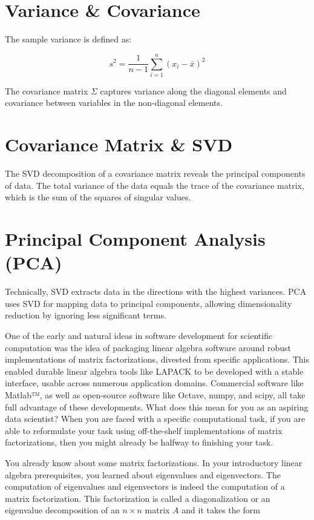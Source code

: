 \documentclass{ximera}
\begin{document}
\begin{problem}
\begin{problem}
\section{Variance \& Covariance}
The sample variance is defined as:

\[
s^2 = \frac{1}{n-1} \sum_{i=1}^n (x_i - \bar{x})^2
\]

The covariance matrix \(\Sigma\) captures variance along the diagonal elements and covariance between variables in the non-diagonal elements.

\section{Covariance Matrix \& SVD}
The SVD decomposition of a covariance matrix reveals the principal components of data. The total variance of the data equals the trace of the covariance matrix, which is the sum of the squares of singular values.

\section{Principal Component Analysis (PCA)}
Technically, SVD extracts data in the directions with the highest variances. PCA uses SVD for mapping data to principal components, allowing dimensionality reduction by ignoring less significant terms.

One of the early and natural ideas in software development for scientific computation was the idea of packaging linear algebra software around robust implementations of matrix factorizations, divested from specific applications. This enabled durable linear algebra tools like LAPACK to be developed with a stable interface, usable across numerous application domains. Commercial software like Matlab™, as well as open-source software like Octave, numpy, and scipy, all take full advantage of these developments. What does this mean for you as an aspiring data scientist? When you are faced with a specific computational task, if you are able to reformulate your task using off-the-shelf implementations of matrix factorizations, then you might already be halfway to finishing your task.

You already know about some matrix factorizations. In your introductory linear algebra prerequisites, you learned about eigenvalues and eigenvectors. The computation of eigenvalues and eigenvectors is indeed the computation of a matrix factorization. This factorization is called a diagonalization or an eigenvalue decomposition of an \( n \times n \) matrix \( A \) and it takes the form


\end{problem}
\end{problem}
\end{document}
